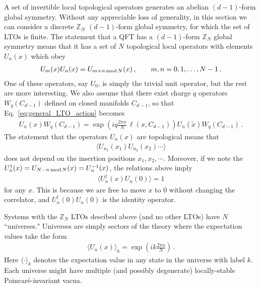 \documentclass[11pt]{article}
\begin{document}
A set of invertible local topological operators generates an abelian $(d-1)$-form global
symmetry. Without any appreciable loss of generality, in this section we can consider a discrete $\mathbb{Z}_N$
$(d-1)$-form global symmetry, for which the set of LTOs is finite.  The statement that a QFT has a $(d-1)$-form $\mathbb{Z}_N$ global symmetry means that  it has a set of $N$ topological local
operators with elements $U_{n}(x)$ which obey
\begin{align}
    U_{m}(x) U_{n}(x) = U_{m+n \textrm{\,mod\,} N}(x)\,, \qquad m,n=0,1,\dots,N-1 \,.
    \label{eq:fusion_rule}
\end{align}
One of these operators, say $U_{0}$, is simply the trivial unit operator, but the
rest are more interesting.  We also assume that there exist charge $q$ operators $W_q(C_{d-1})$
defined on closed manifolds $C_{d-1}$, so 
that Eq.~\eqref{eq:general_LTO_action} becomes
\begin{align}
    U_{n}(x) W_q(C_{d-1}) = \exp{\left(i  q\frac{2\pi n}{N} \,\mathcal{\ell}(x, C_{d-1})\right)} 
    U_{n}(\tilde{x})  W_q(C_{d-1})\,.
\label{eq:ZN_LTO_action}
\end{align}
The statement that the operators $U_n(x)$ are topological means that 
\begin{align}
    \langle U_{n_1}(x_1) U_{n_2}(x_2)  \cdots \rangle 
\end{align}
does not depend on the insertion positions $x_1, x_2, \cdots$.  Moreover, if we note the $U_{n}^{\dag}(x) = U_{N-n \textrm{\,mod\,} N}(x)= U_n^{-1}(x)$, the relations above imply
\begin{align}
    \langle U_{n}^{\dag}(x) U_{n}(0) \rangle = 1
    \label{eq:LTO_correlator}
\end{align}
for any $x$. This is because we are free to move $x$ to $0$ without changing the
correlator, and $U_{n}^{\dag}(0) U_{n}(0)$ is the identity operator.  

Systems with the $\mathbb{Z}_N$ LTOs descibed above (and no other LTOs) have $N$
``universes."   Universes are simply sectors of the theory where the expectation values take the form
\begin{align}
\langle U_{n}(x) \rangle_k = \exp{\left(i k \frac{2\pi n}{N}\right)} \,.
\end{align}
Here $\langle \cdot \rangle_k$ denotes the expectation
value in any state in the universe with label $k$. Each universe might have
multiple (and possibly degenerate) locally-stable Poincar\'e-invariant vacua. 
\end{document}
